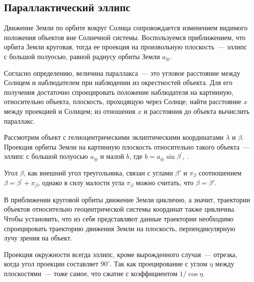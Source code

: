 \subsection{Параллактический эллипс}
Движение Земли по орбите вокруг Солнца сопровождается изменением видимого положения объектов вне Солнечной системы. Воспользуемся приближением, что орбита Земли круговая, тогда ее проекция на произвольную плоскость~--- эллипс с большой полуосью, равной радиусу орбиты Земли $a_\oplus$. 

Согласно определению, величина параллакса~--- это угловое расстояние между Солнцем и наблюдателем при наблюдении из окрестностей объекта. Для его получения достаточно спроецировать положение наблюдателя на картинную, относительно объекта, плоскость, проходящую через Солнце; найти расстояние $x$ между проекцией и Солнцем; из отношения $x$ и расстояния до объекта вычислить параллакс.

Рассмотрим объект с гелиоцентрическими эклиптическими координатами $\lambda$ и $\beta$. Проекция орбиты Земли на картинную плоскость относительно такого объекта~--- эллипс с большой полуосью $a_\oplus$ и малой $b$, где $b = a_\oplus \sin \beta^\prime$, . %

Угол $\beta$, как внешний угол треугольника, связан с углами $\beta'$ и $\pi_{\beta}$ соотношением $\beta = \beta^\prime + \pi_{\beta}$, однако в силу малости угла $\pi_{\beta}$ можно считать, что $\beta = \beta'$.

В приближении круговой орбиты движение Земли циклично, а значит, траектории объектов относительно геоцентрической системы координат также цикличны. Чтобы установить, что из себя представляют данные траектории необходимо спроецировать траекторию движения Земли на плоскость, перпендикулярную лучу зрения на объект.

Проекция окружности всегда эллипс, кроме вырожденного случая~--- отрезка, когда угол проекции составляет $90^\circ$. Так как проецирование с углом $\eta$ между плоскостями~--- тоже самое, что сжатие с коэффициентом $1/\cos\eta$.


